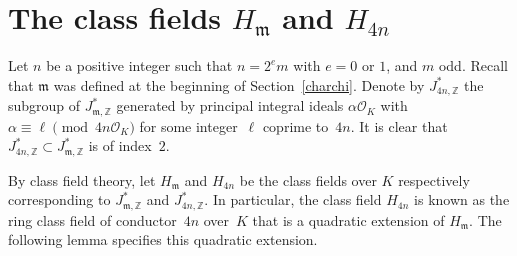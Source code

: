 \documentclass[11pt, reqno]{amsart}
\theoremstyle{plain}
\theoremstyle{definition}
\numberwithin{equation}{section}
\begin{document}

























\section{The class fields $H_{\mathfrak{m}}$ and $H_{4n}$}\label{classfield}

Let $n$ be a positive integer such that $n=2^{e}m$ with $e=0$ or $1$, and  $m$  odd. Recall that   $\mathfrak{m}$ was defined  at the beginning of Section~\ref{charchi}. Denote by $J_{4n,\mathbb{Z}}^{*}$ the subgroup of $J_{\mathfrak{m},\mathbb{Z}}^{*}$ generated by principal integral ideals $\alpha\mathcal{O}_{K}$ with $\alpha\equiv \ell\pmod{4n\mathcal{O}_{K}}$ for some integer~$\ell$ coprime to~$4n$. It is clear that $J_{4n,\mathbb{Z}}^{*}\subset J_{\mathfrak{m},\mathbb{Z}}^{*}$ is of index~$2$.

By class field theory, let $H_{\mathfrak{m}}$ and $H_{4n}$ be the class fields over $K$ respectively corresponding  to $J_{\mathfrak{m},\mathbb{Z}}^{*}$ and $J_{4n,\mathbb{Z}}^{*}$. In particular, the class field $H_{4n}$ is known as the ring class field of conductor~$4n$ over~$K$ that is a quadratic extension of $H_{\mathfrak{m}}$. The following lemma specifies this quadratic extension.
\end{document}
